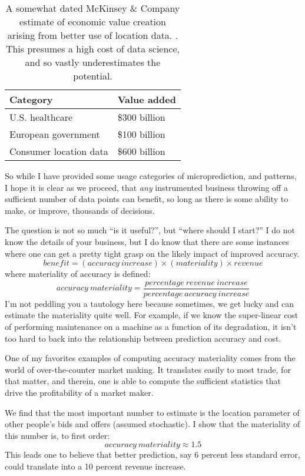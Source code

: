 \begin{table}[h!]
\label{tab:estimates}
\begin{tabular}{|l|l|}
\hline
 Category & Value added  \\
 \hline
   U.S. healthcare  & \$300 billion \\
   European government  & \$100 billion \\
   Consumer location data  & \$600 billion \\
  \hline
\end{tabular}
\caption{A somewhat dated McKinsey & Company estimate of economic value creation arising from better use of location data. \cite{McKinseyCompany2011BigProductivity}. This presumes a high cost of data science, and so vastly underestimates the potential.}
\end{table}

So while I have provided some usage categories of microprediction, and patterns,  I hope it is clear as we proceed, that {\em any} instrumented business throwing off a sufficient number of data points can benefit, so long as there is some ability to make, or improve, thousands of decisions. 

The question is not so much ``is it useful?'', but ``where should I start?'' I do not know the details of your business, but I do know that there are some instances where one can get a pretty tight grasp on the likely impact of improved accuracy. 
$$
benefit = (accuracy\ increase) \times (materiality) \times revenue 
$$
where materiality of accuracy is defined:
$$
   accuracy\ materiality = \frac{percentage\ revenue\ increase}{percentage\ accuracy\ increase}
$$
I'm not peddling you a tautology here because sometimes, we get lucky and can estimate the materiality quite well. For example, if we know the super-linear cost of performing maintenance on a machine as a function of its degradation, it isn't too hard to back into the relationship between prediction accuracy and cost.

One of my favorites examples of computing accuracy materiality comes from the world of over-the-counter market making. It translates easily to most trade, for that matter, and therein, one is able to compute the sufficient statistics that drive the profitability of a market maker.

We find that the most important number to estimate is the location parameter of other people's bids and offers (assumed stochastic). I show that the materiality of this number is, to first order:
$$
   accuracy\ materiality \approx 1.5
$$
This leads one to believe that better prediction, say 6 percent less standard error, could translate into a 10 percent revenue increase.

